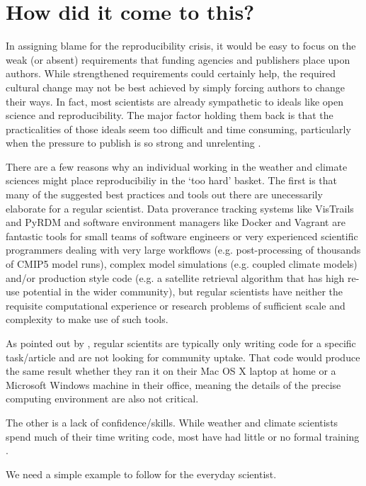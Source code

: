 \section{How did it come to this?}

In assigning blame for the reproducibility crisis, it would be easy to focus on the weak (or absent) requirements that funding agencies and publishers place upon authors. While strengthened requirements could certainly help, the required cultural change may not be best achieved by simply forcing authors to change their ways. In fact, most scientists are already sympathetic to ideals like open science and reproducibility. The major factor holding them back is that the practicalities of those ideals seem too difficult and time consuming, particularly when the pressure to publish is so strong and unrelenting \citep[e.g.][]{Stodden2010}. 

There are a few reasons why an individual working in the weather and climate sciences might place reproducibiliy in the `too hard' basket. The first is that many of the suggested best practices and tools out there are unecessarily elaborate for a regular scientist. Data proverance tracking systems like VisTrails \citep{Freire2012} and PyRDM \citep{Jacobs2014} and software environment managers like Docker and Vagrant \citep{Stodden2014} are fantastic tools for small teams of software engineers or very experienced scientific programmers dealing with very large workflows (e.g. post-processing of thousands of CMIP5 model runs), complex model simulations (e.g. coupled climate models) and/or production style code (e.g. a satellite retrieval algorithm that has high re-use potential in the wider community), but regular scientists have neither the requisite computational experience or research problems of sufficient scale and complexity to make use of such tools.      

As pointed out by \citet{Easterbrook2014}, regular scientits are typically only writing code for a specific task/article and are not looking for community uptake. That code would produce the same result whether they ran it on their Mac OS X laptop at home or a Microsoft Windows machine in their office, meaning the details of the precise computing environment are also not critical.

The other is a lack of confidence/skills. While weather and climate scientists spend much of their time writing code, most have had little or no formal training \citet{Hannay2009}.   


We need a simple example to follow for the everyday scientist.